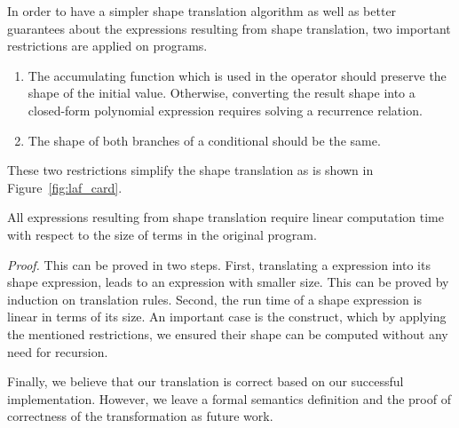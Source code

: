 


In order to have a simpler shape translation algorithm as well as better guarantees about the expressions resulting from shape translation, two important restrictions are applied on \lafsharp{} programs. 
\begin{enumerate}
\item The accumulating function which is used in the \viteratek{} operator should preserve the shape of the initial value. Otherwise, converting the result shape into a closed-form polynomial expression requires solving a recurrence relation.
\item The shape of both branches of a conditional should be the same. 
\end{enumerate}
These two restrictions simplify the shape translation as is shown in Figure~\ref{fig:laf_card}.


\begin{theorems}
\label{theorshapelintime}
All expressions resulting from shape translation require linear computation time with respect to the size of terms in the original \lafsharp{} program.
\end{theorems}
\textit{Proof.} This can be proved in two steps. First, translating a  \lafsharp{} expression into its shape expression, leads to an expression with smaller size. This can be proved by induction on translation rules. Second, the run time of a shape expression is linear in terms of its size. An important case is the \viteratek{} construct, which by applying the mentioned restrictions, we ensured their shape can be computed without any need for recursion. 

Finally, we believe that our translation is correct based on our successful implementation. 
However, we leave a formal semantics definition and the proof of correctness of the transformation as future work. 
